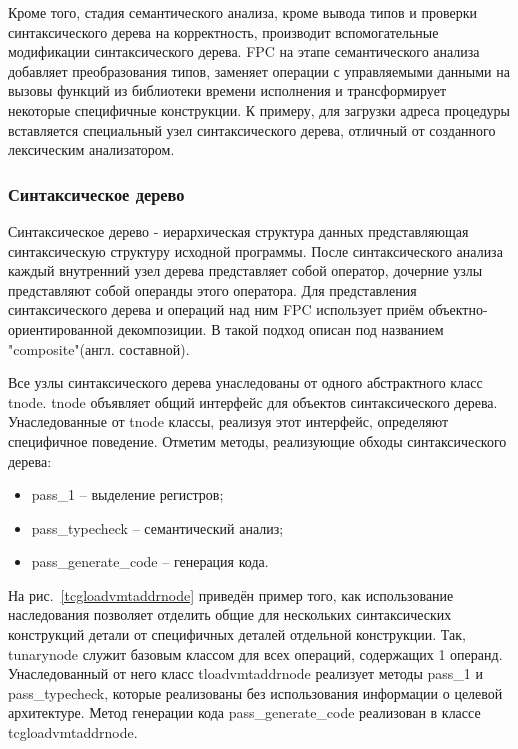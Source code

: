 \documentclass{imcs}
\begin{document}
Кроме того, стадия семантического анализа, кроме вывода типов и проверки синтаксического
дерева на корректность, производит вспомогательные модификации синтаксического дерева.
FPC на этапе семантического анализа добавляет преобразования типов, заменяет операции
с управляемыми данными на вызовы функций из библиотеки времени исполнения и трансформирует
некоторые специфичные конструкции. К примеру, для загрузки адреса процедуры вставляется
специальный узел синтаксического дерева, отличный от созданного лексическим анализатором.

\subsubsection{Синтаксическое дерево}

Синтаксическое дерево - иерархическая структура данных представляющая синтаксическую
структуру исходной программы\cite{dragonbook}. После синтаксического анализа каждый внутренний узел 
дерева представляет собой оператор, дочерние узлы представляют собой операнды этого
оператора. Для представления синтаксического дерева и операций над ним FPC использует
приём объектно-ориентированной декомпозиции. В \cite{gof} такой подход описан под
названием "composite"(англ. составной).

Все узлы синтаксического дерева унаследованы от одного абстрактного класс tnode.
tnode объявляет общий интерфейс для объектов синтаксического дерева. Унаследованные
от tnode классы, реализуя этот интерфейс, определяют специфичное поведение. Отметим
методы, реализующие обходы синтаксического дерева:
\begin{itemize}
    \item pass\_1 -- выделение регистров;
    \item pass\_typecheck -- семантический анализ;
    \item pass\_generate\_code -- генерация кода.
\end{itemize}

На рис.~\ref{tcgloadvmtaddrnode} приведён пример того, как использование
наследования позволяет отделить общие для 
нескольких синтаксических конструкций детали от специфичных деталей отдельной конструкции.
Так, tunarynode служит базовым классом для всех операций, содержащих 1 операнд.
Унаследованный от него класс tloadvmtaddrnode реализует методы pass\_1 и pass\_typecheck,
которые реализованы без использования информации о целевой архитектуре. Метод
генерации кода pass\_generate\_code реализован в классе \\ tcgloadvmtaddrnode.
\end{document}
